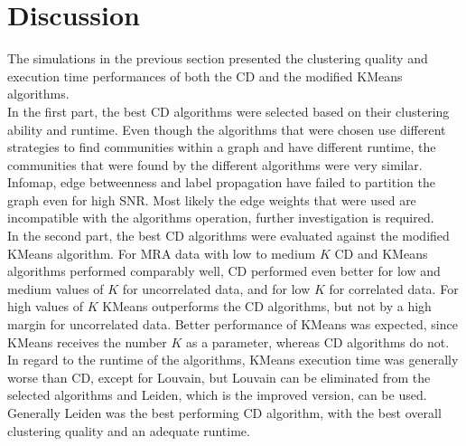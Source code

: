 \center

\section{Discussion}

\raggedright

The simulations in the previous section presented the clustering quality and execution time performances of both the \acrshort{CD} and the modified KMeans algorithms.\\
In the first part, the best \acrshort{CD} algorithms were selected based on their clustering ability and runtime. Even though the algorithms that were chosen use different strategies to find communities within a graph and have different runtime, the communities that were found by the different algorithms were very similar. Infomap, edge betweenness and label propagation have failed to partition the graph even for high \acrshort{SNR}. Most likely the edge weights that were used are incompatible with the algorithms operation, further investigation is required.\\
In the second part, the best \acrshort{CD} algorithms were evaluated against the modified KMeans algorithm. For \acrshort{MRA} data with low to medium $K$ \acrshort{CD} and KMeans algorithms performed comparably well, \acrshort{CD} performed even better for low and medium values of $K$ for uncorrelated data, and for low $K$ for correlated data. For high values of $K$ KMeans outperforms the \acrshort{CD} algorithms, but not by a high margin for uncorrelated data. Better performance of KMeans was expected, since KMeans receives the number $K$ as a parameter, whereas \acrshort{CD} algorithms do not.\\
In regard to the runtime of the algorithms, KMeans execution time was generally worse than \acrshort{CD}, except for Louvain, but Louvain can be eliminated from the selected algorithms and Leiden, which is the improved version, can be used. Generally Leiden was the best performing \acrshort{CD} algorithm, with the best overall clustering quality and an adequate runtime.